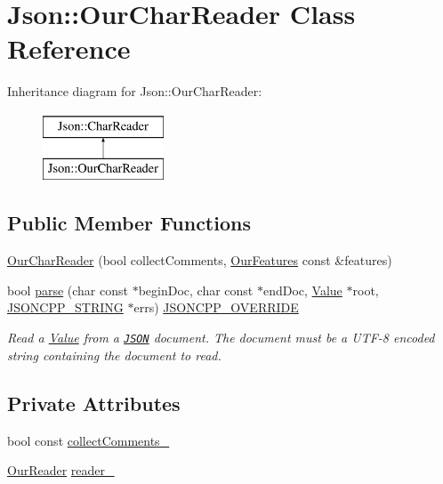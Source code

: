 \hypertarget{class_json_1_1_our_char_reader}{}\section{Json\+:\+:Our\+Char\+Reader Class Reference}
\label{class_json_1_1_our_char_reader}
Inheritance diagram for Json\+:\+:Our\+Char\+Reader\+:\begin{figure}[H]
\begin{center}
\leavevmode
\includegraphics[height=2.000000cm]{class_json_1_1_our_char_reader}
\end{center}
\end{figure}
\subsection*{Public Member Functions}
\begin{DoxyCompactItemize}
\item 
\hyperlink{class_json_1_1_our_char_reader_a5015506620e7ba7bab417756fa1ca9fe}{Our\+Char\+Reader} (bool collect\+Comments, \hyperlink{class_json_1_1_our_features}{Our\+Features} const \&features)
\item 
bool \hyperlink{class_json_1_1_our_char_reader_a547f08ec5a9951ca69e8bb2e90296c83}{parse} (char const $\ast$begin\+Doc, char const $\ast$end\+Doc, \hyperlink{class_json_1_1_value}{Value} $\ast$root, \hyperlink{config_8h_a1e723f95759de062585bc4a8fd3fa4be}{J\+S\+O\+N\+C\+P\+P\+\_\+\+S\+T\+R\+I\+NG} $\ast$errs) \hyperlink{config_8h_a824d6199c91488107e443226fa6022c5}{J\+S\+O\+N\+C\+P\+P\+\_\+\+O\+V\+E\+R\+R\+I\+DE}
\begin{DoxyCompactList}\small\item\em Read a \hyperlink{class_json_1_1_value}{Value} from a \href{http://www.json.org}{\tt J\+S\+ON} document. The document must be a U\+T\+F-\/8 encoded string containing the document to read. \end{DoxyCompactList}\end{DoxyCompactItemize}
\subsection*{Private Attributes}
\begin{DoxyCompactItemize}
\item 
bool const \hyperlink{class_json_1_1_our_char_reader_aa6afd3d0f754cadad0f6d2be38bcfee0}{collect\+Comments\+\_\+}
\item 
\hyperlink{class_json_1_1_our_reader}{Our\+Reader} \hyperlink{class_json_1_1_our_char_reader_aedd4520b8570654ed7aa0726075ee58d}{reader\+\_\+}
\end{DoxyCompactItemize}


